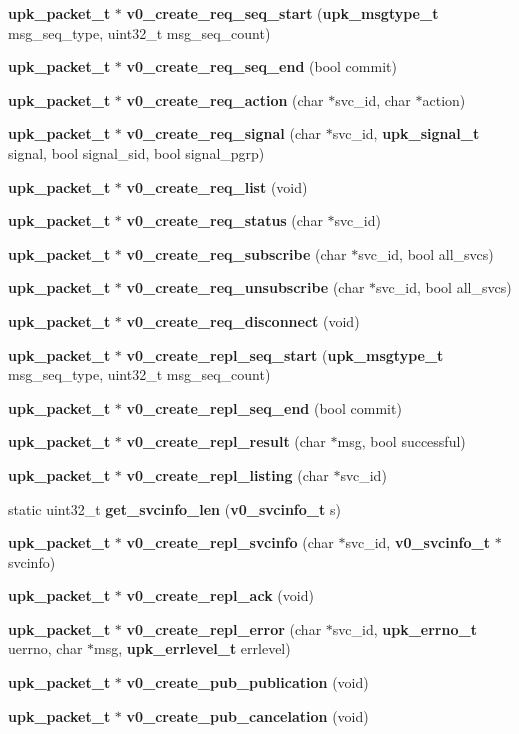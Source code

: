 \begin{DoxyCompactItemize}
{\bf upk\_\-packet\_\-t} $\ast$ {\bf v0\_\-create\_\-req\_\-seq\_\-start} ({\bf upk\_\-msgtype\_\-t} msg\_\-seq\_\-type, uint32\_\-t msg\_\-seq\_\-count)
\item 
{\bf upk\_\-packet\_\-t} $\ast$ {\bf v0\_\-create\_\-req\_\-seq\_\-end} (bool commit)
\item 
{\bf upk\_\-packet\_\-t} $\ast$ {\bf v0\_\-create\_\-req\_\-action} (char $\ast$svc\_\-id, char $\ast$action)
\item 
{\bf upk\_\-packet\_\-t} $\ast$ {\bf v0\_\-create\_\-req\_\-signal} (char $\ast$svc\_\-id, {\bf upk\_\-signal\_\-t} signal, bool signal\_\-sid, bool signal\_\-pgrp)
\item 
{\bf upk\_\-packet\_\-t} $\ast$ {\bf v0\_\-create\_\-req\_\-list} (void)
\item 
{\bf upk\_\-packet\_\-t} $\ast$ {\bf v0\_\-create\_\-req\_\-status} (char $\ast$svc\_\-id)
\item 
{\bf upk\_\-packet\_\-t} $\ast$ {\bf v0\_\-create\_\-req\_\-subscribe} (char $\ast$svc\_\-id, bool all\_\-svcs)
\item 
{\bf upk\_\-packet\_\-t} $\ast$ {\bf v0\_\-create\_\-req\_\-unsubscribe} (char $\ast$svc\_\-id, bool all\_\-svcs)
\item 
{\bf upk\_\-packet\_\-t} $\ast$ {\bf v0\_\-create\_\-req\_\-disconnect} (void)
\item 
{\bf upk\_\-packet\_\-t} $\ast$ {\bf v0\_\-create\_\-repl\_\-seq\_\-start} ({\bf upk\_\-msgtype\_\-t} msg\_\-seq\_\-type, uint32\_\-t msg\_\-seq\_\-count)
\item 
{\bf upk\_\-packet\_\-t} $\ast$ {\bf v0\_\-create\_\-repl\_\-seq\_\-end} (bool commit)
\item 
{\bf upk\_\-packet\_\-t} $\ast$ {\bf v0\_\-create\_\-repl\_\-result} (char $\ast$msg, bool successful)
\item 
{\bf upk\_\-packet\_\-t} $\ast$ {\bf v0\_\-create\_\-repl\_\-listing} (char $\ast$svc\_\-id)
\item 
static uint32\_\-t {\bf get\_\-svcinfo\_\-len} ({\bf v0\_\-svcinfo\_\-t} s)
\item 
{\bf upk\_\-packet\_\-t} $\ast$ {\bf v0\_\-create\_\-repl\_\-svcinfo} (char $\ast$svc\_\-id, {\bf v0\_\-svcinfo\_\-t} $\ast$svcinfo)
\item 
{\bf upk\_\-packet\_\-t} $\ast$ {\bf v0\_\-create\_\-repl\_\-ack} (void)
\item 
{\bf upk\_\-packet\_\-t} $\ast$ {\bf v0\_\-create\_\-repl\_\-error} (char $\ast$svc\_\-id, {\bf upk\_\-errno\_\-t} uerrno, char $\ast$msg, {\bf upk\_\-errlevel\_\-t} errlevel)
\item 
{\bf upk\_\-packet\_\-t} $\ast$ {\bf v0\_\-create\_\-pub\_\-publication} (void)
\item 
{\bf upk\_\-packet\_\-t} $\ast$ {\bf v0\_\-create\_\-pub\_\-cancelation} (void)
\end{DoxyCompactItemize}



